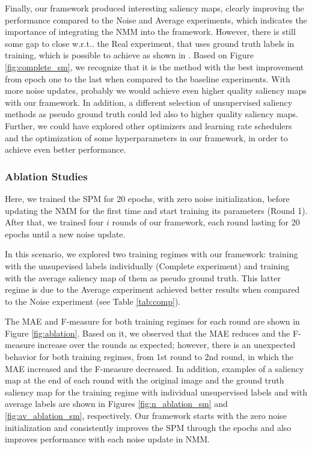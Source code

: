 \documentclass{article}
\makeatletter
\DeclareRobustCommand\onedot{\futurelet\@let@token\@onedot}
\def\@onedot{\ifx\@let@token.\else.\null\fi\xspace}
\def\wrt{w.r.t\onedot} \def\dof{d.o.f\onedot}
\makeatother
\begin{document}
Finally, our framework produced interesting saliency maps, clearly improving the performance compared to the Noise and Average experiments, which indicates the importance of integrating the NMM into the framework. However, there is still some gap to close \wrt the Real experiment, that uses ground truth labels in training, which is possible to achieve as shown in \cite{zhang2018}. Based on Figure \ref{fig:complete_sm}, we recognize that it is the method with the best improvement from epoch one to the last when compared to the baseline experiments. With more noise updates, probably we would achieve even higher quality saliency maps with our framework. In addition, a different selection of unsupervised saliency methods as pseudo ground truth could led also to higher quality saliency maps. Further, we could have explored other optimizers and learning rate schedulers and the optimization of some hyperparameters in our framework, in order to achieve even better performance.

\subsubsection{Ablation Studies}

Here, we trained the SPM for 20 epochs, with zero noise initialization, before updating the NMM for the first time and start training its parameters (Round 1). After that, we trained four $i$ rounds of our framework, each round lasting for 20 epochs until a new noise update. 

In this scenario, we explored two training regimes with our framework: training with the unsupevised labels individually (Complete experiment) and training with the average saliency map of them as pseudo ground truth. This latter regime is due to the Average experiment achieved better results when compared to the Noise experiment (see Table \ref{tab:comp}).

The MAE and F-measure for both training regimes for each round are shown in Figure \ref{fig:ablation}. Based on it, we observed that the MAE reduces and the F-measure increase over the rounds as expected; however, there is an unexpected behavior for both training regimes, from 1st round to 2nd round, in which the MAE increased and the F-measure decreased. In addition, examples of a saliency map at the end of each round with the original image and the ground truth saliency map for the training regime with individual unsupervised labels and with average labels are shown in Figures \ref{fig:n_ablation_sm} and \ref{fig:av_ablation_sm}, respectively. Our framework starts with the zero noise initialization and consistently improves the SPM through the epochs and also improves performance with each noise update in NMM. 
\end{document}
